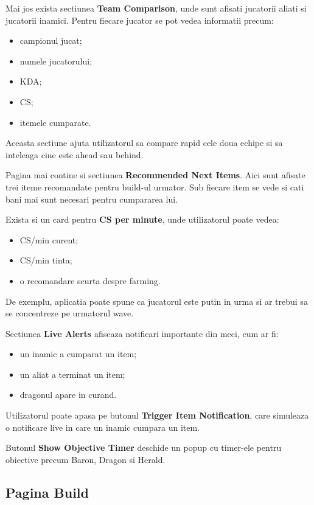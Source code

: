 \documentclass[12pt,a4paper]{article}
\begin{document}
Mai jos exista sectiunea \textbf{Team Comparison}, unde sunt afisati jucatorii aliati si jucatorii inamici. Pentru fiecare jucator se pot vedea informatii precum:

\begin{itemize}
    \item campionul jucat;
    \item numele jucatorului;
    \item KDA;
    \item CS;
    \item itemele cumparate.
\end{itemize}

Aceasta sectiune ajuta utilizatorul sa compare rapid cele doua echipe si sa inteleaga cine este ahead sau behind.

Pagina mai contine si sectiunea \textbf{Recommended Next Items}. Aici sunt afisate trei iteme recomandate pentru build-ul urmator. Sub fiecare item se vede si cati bani mai sunt necesari pentru cumpararea lui.

Exista si un card pentru \textbf{CS per minute}, unde utilizatorul poate vedea:

\begin{itemize}
    \item CS/min curent;
    \item CS/min tinta;
    \item o recomandare scurta despre farming.
\end{itemize}

De exemplu, aplicatia poate spune ca jucatorul este putin in urma si ar trebui sa se concentreze pe urmatorul wave.

Sectiunea \textbf{Live Alerts} afiseaza notificari importante din meci, cum ar fi:

\begin{itemize}
    \item un inamic a cumparat un item;
    \item un aliat a terminat un item;
    \item dragonul apare in curand.
\end{itemize}

Utilizatorul poate apasa pe butonul \textbf{Trigger Item Notification}, care simuleaza o notificare live in care un inamic cumpara un item.

Butonul \textbf{Show Objective Timer} deschide un popup cu timer-ele pentru obiective precum Baron, Dragon si Herald.

\subsection{Pagina Build}
\end{document}
